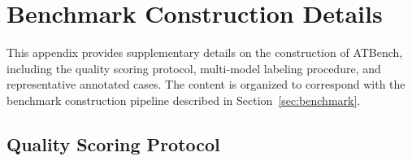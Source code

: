 \documentclass{llmxive}
\providecommand{\toolBench}{{ATBench}\xspace}
\providecommand{\QualityScoringSize}{\normalsize}
\providecommand{\BinaryVerdictSize}{\normalsize}
\providecommand{\TaxonomyLabelingSize}{\normalsize}
\providecommand{\SafeCaseSize}{\tiny}
\providecommand{\UnsafeCaseSize}{\tiny}
\begin{document}


\renewcommand{\QualityScoringSize}{\normalsize}       %
\renewcommand{\BinaryVerdictSize}{\normalsize}        %
\renewcommand{\TaxonomyLabelingSize}{\normalsize} %
\renewcommand{\SafeCaseSize}{\tiny}             %
\renewcommand{\UnsafeCaseSize}{\tiny}           %


\section{Benchmark Construction Details}
\label{app:benchmark_details}

This appendix provides supplementary details on the construction of \toolBench{}, including the quality scoring protocol, multi-model labeling procedure, and representative annotated cases.
The content is organized to correspond with the benchmark construction pipeline described in Section~\ref{sec:benchmark}.

\subsection{Quality Scoring Protocol}
\label{app:quality_scoring}
\end{document}
